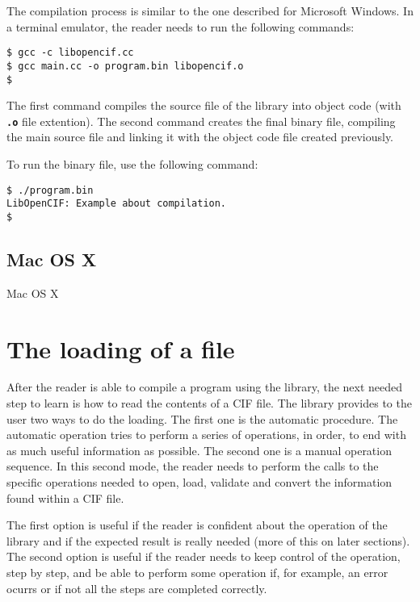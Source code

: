 \documentclass[11pt,twoside,openany,x11names,svgnames]{memoir}
\begin{document}
The compilation process is similar to the one described for Microsoft Windows. In a terminal emulator, the reader needs to run the following commands:

\begin{lstlisting}[frame=single,style=SystemCommandStyle]
$ gcc -c libopencif.cc
$ gcc main.cc -o program.bin libopencif.o
$
\end{lstlisting}

The first command compiles the source file of the library into object code (with \textbf{\texttt{.o}} file extention). The second command creates the final binary file, compiling the main source file and linking it with the object code file created previously.

To run the binary file, use the following command:

\begin{lstlisting}[frame=single,style=SystemCommandStyle]
$ ./program.bin
LibOpenCIF: Example about compilation.
$
\end{lstlisting}

\subsection{Mac OS X}\label{Mac-OS-X}

Mac OS X

\section{The loading of a file}\label{The-loading-of-a-file}

After the reader is able to compile a program using the library, the next needed step to learn is how to read the contents of a CIF file. The library provides to the user two ways to do the loading. The first one is the automatic procedure. The automatic operation tries to perform a series of operations, in order, to end with as much useful information as possible. The second one is a manual operation sequence. In this second mode, the reader needs to perform the calls to the specific operations needed to open, load, validate and convert the information found within a CIF file.

The first option is useful if the reader is confident about the operation of the library and if the expected result is really needed (more of this on later sections). The second option is useful if the reader needs to keep control of the operation, step by step, and be able to perform some operation if, for example, an error ocurrs or if not all the steps are completed correctly.
\end{document}
